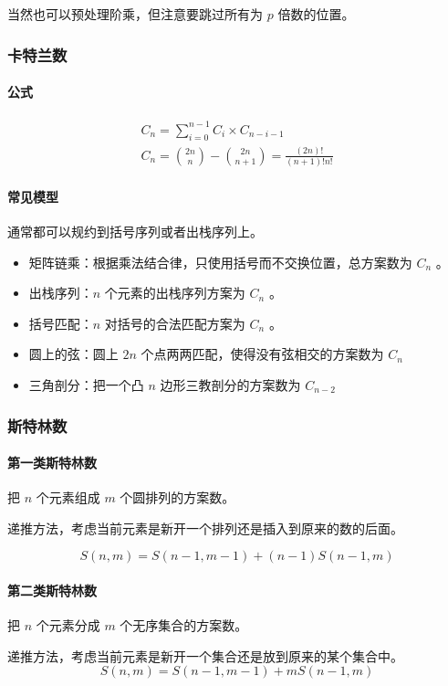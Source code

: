 \documentclass[UTF-8]{ctexart}
\begin{document}
			当然也可以预处理阶乘，但注意要跳过所有为 $p$ 倍数的位置。
			\subsubsection{卡特兰数}
			\paragraph{公式}
			
			\begin{align}
			C_n=\sum_{i=0}^{n-1} C_i \times C_{n-i-1} \nonumber \\
			C_n={2n \choose n}-{2n \choose n+1}=\frac{(2n)!}{(n+1)!n!} \nonumber
			\end{align}
			
			\paragraph{常见模型}
			通常都可以规约到括号序列或者出栈序列上。
			\begin{itemize}
				\item 矩阵链乘：根据乘法结合律，只使用括号而不交换位置，总方案数为 $C_n$ 。
				\item 出栈序列：$n$ 个元素的出栈序列方案为 $C_n$ 。
				\item 括号匹配：$n$ 对括号的合法匹配方案为 $C_n$ 。
				\item 圆上的弦：圆上 $2n$ 个点两两匹配，使得没有弦相交的方案数为 $C_n$
				\item 三角剖分：把一个凸 $n$ 边形三教剖分的方案数为 $C_{n-2}$
			\end{itemize}
			\subsubsection{斯特林数}
			\paragraph{第一类斯特林数} 把 $n$ 个元素组成 $m$ 个圆排列的方案数。
			
			递推方法，考虑当前元素是新开一个排列还是插入到原来的数的后面。
			
			$$S(n,m)=S(n-1,m-1)+(n-1)S(n-1,m)$$
			\paragraph{第二类斯特林数} 把 $n$ 个元素分成 $m$ 个无序集合的方案数。
			
			递推方法，考虑当前元素是新开一个集合还是放到原来的某个集合中。
			$$S(n,m)=S(n-1,m-1)+mS(n-1,m)$$
			
\end{document}
